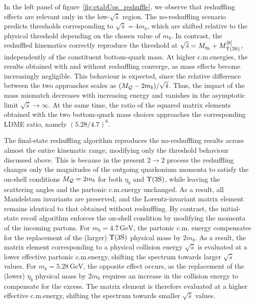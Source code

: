 In the left panel of figure~\ref{fig:etabUps_reshuffle}, we observe that reshuffling effects are relevant only in the low-$\sqrt{\hat s}$ region. The no-reshuffling scenario predicts thresholds corresponding to $\sqrt{\hat s}=4m_b$, which are shifted relative to the physical threshold depending on the chosen value of $m_b$. In contrast, the reshuffled kinematics correctly reproduce the threshold at $\sqrt{\hat s}=M_{\eta_b}+M^{[8]}_{\Upsilon(3\mathrm{S})}$, independently of the constituent bottom-quark mass. At higher c.m.\@ energies, the results obtained with and without reshuffling converge, as mass effects become increasingly negligible. This behaviour is expected, since the relative difference between the two approaches scales as $(M_{\cal Q} - 2m_b)/\sqrt{\hat s}$. Thus, the impact of the mass mismatch decreases with increasing energy and vanishes in the asymptotic limit $\sqrt{\hat s}\to\infty$. At the same time, the ratio of the squared matrix elements obtained with the two bottom-quark mass choices approaches the corresponding LDME ratio, namely $(5.28/4.7)^6$.

The final-state reshuffling algorithm reproduces the no-reshuffling results across almost the entire kinematic range, modifying only the threshold behaviour discussed above. This is because in the present $2\to2$ process the reshuffling changes only the magnitudes of the outgoing quarkonium momenta to satisfy the on-shell conditions $M_{\cal Q}=2m_b$ for both $\eta_b$ and $\Upsilon(3\mathrm{S})$, while leaving the scattering angles and the partonic c.m.\@ energy unchanged. As a result, all Mandelstam invariants are preserved, and the Lorentz-invariant matrix element remains identical to that obtained without reshuffling.
By contrast, the initial-state recoil algorithm enforces the on-shell condition by modifying the momenta of the incoming partons. 
For $m_b=4.7\,\mathrm{GeV}$, the partonic c.m. energy compensates for the replacement of the (larger) $\Upsilon(3\mathrm{S})$ physical mass by $2m_b$.  
As a result, the matrix element corresponding to a physical collision energy $\sqrt{\hat s}$ is evaluated at a lower effective partonic c.m.\@ energy, shifting the spectrum towards larger $\sqrt{\hat{s}}$ values. For $m_b=5.28\,\mathrm{GeV}$, the opposite effect occurs, as the replacement of the (lower) $\eta_b$ physical mass by $2m_b$ requires an increase in the collision energy to compensate for the excess. The matrix element is therefore evaluated at a higher effective c.m.\@ energy, shifting the spectrum towards smaller $\sqrt{\hat{s}}$ values.

